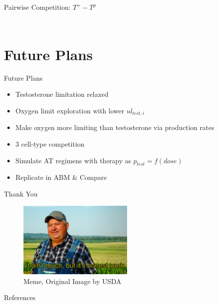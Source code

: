 \documentclass[aspectratio=169,9pt]{beamer}
\begin{document}
\begin{frame}{Pairwise Competition: $T^+ - T^p$}
\begin{columns}
\begin{column}{0.5\textwidth}
\begin{figure}[h]
      \label{fig_Tpos-Tpro_testlims}
      \end{figure}
    \end{column}
  \end{columns}
\end{frame}

\section{Future Plans}
\begin{frame}{Future Plans}
  \begin{itemize}
    \item Testosterone limitation relaxed
    \item Oxygen limit exploration with lower $ul_{test,i}$
    \item Make oxygen more limiting than testosterone via production rates
    \item 3 cell-type competition
    \item Simulate AT regimens with therapy as $p_{test} = f(dose)$
    \item Replicate in ABM \& Compare
  \end{itemize}
\end{frame}

\begin{frame}{Thank You}
  \begin{figure}
    \includegraphics[width=0.5\textwidth]{honestwork}
    \caption{Meme, Original Image by USDA}
  \end{figure}
\end{frame}

\begin{frame}[allowframebreaks]{References}
  \nocite{atcc}
  \nocite{Steward}
  \nocite{Titus}
  \nocite{Stamey}
  \nocite{Strobl}
  \printbibliography
\end{frame}
\end{document}
